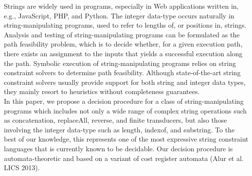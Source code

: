 
Strings are widely used in programs, especially in Web applications written in, e.g., JavaScript, PHP, and Python. The integer data-type occurs naturally in string-manipulating programs, used to refer to lengths of, or positions in, strings. 
Analysis and testing of string-manipulating programs can be formulated as the path feasibility problem, which is to decide whether,  
for a given execution path, there exists an assignment to the inputs that yields a successful execution along the path. 
Symbolic execution of string-manipulating programs relies on string constraint solvers to determine  path feasibility.
Although state-of-the-art string constraint solvers usually provide support for both string and integer data types,   
they mainly resort to heuristics without completeness guarantees. \\ %
%
In this paper, we propose a decision procedure 
for a class of string-manipulating programs
which includes  not only a wide range of complex string operations such as concatenation, replaceAll, reverse, and finite transducers, but also those involving the integer data-type such as length, indexof, and substring. To the best of our knowledge, this represents one of the most expressive string constraint languages that is currently known to be decidable.  Our decision procedure is automata-theoretic and based on a variant of cost register automata (Alur et al. LICS 2013). 
